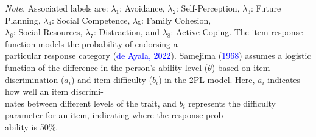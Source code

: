 \documentclass[
  man,floatsintext]{apa7}
\newenvironment{lltable}{\begin{landscape}\centering\begin{ThreePartTable}}{\end{ThreePartTable}\end{landscape}}
\begin{document}
\begin{lltable}

\begin{TableNotes}[para]
\normalsize{\textit{Note.} {\justifying Associated labels are: $\lambda_1$: Avoidance, $\lambda_2$: Self-Perception, $\lambda_3$: Future Planning, $\lambda_4$: Social Competence, $\lambda_5$: Family Cohesion,\\ $\lambda_6$: Social Resources, $\lambda_7$: Distraction, and $\lambda_8$: Active Coping. The item response function models the probability of endorsing a \\particular response category ({\textcolor{blue}{de Ayala, 2022}}). Samejima ({\textcolor{blue}{1968}}) assumes a logistic function of the difference in the person's ability level ($\theta$) based on item discrimination ($a_i$) and item difficulty ($b_i$) in the 2PL model. Here, $a_i$ indicates how well an item discrimi-\\nates between different levels of the trait, and $b_i$ represents the difficulty parameter for an item, indicating where the response prob-\\ability is 50\%.}}
\end{TableNotes}

\footnotesize{

}
\end{lltable}
\end{document}
